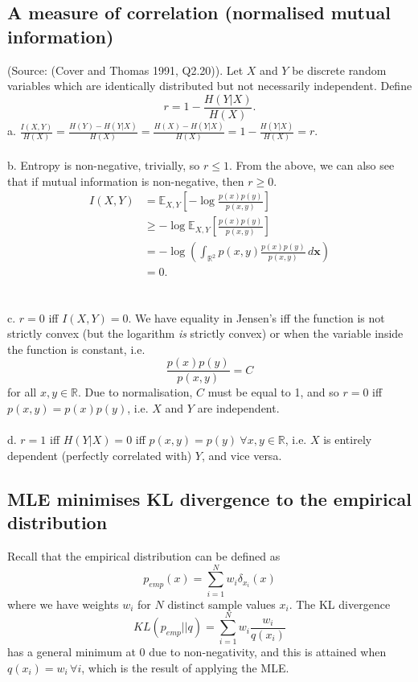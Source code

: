 \documentclass{article}
\begin{document}
\subsection{A measure of correlation (normalised mutual information)}
(Source: (Cover and Thomas 1991, Q2.20)). Let $X$ and $Y$ be discrete random variables which are identically distributed but not necessarily independent. Define
\begin{equation*}
r = 1 - \frac{H(Y|X)}{H(X)}.
\end{equation*}
a. $\frac{I(X,Y)}{H(X)} = \frac{H(Y) - H(Y|X)}{H(X)} = \frac{H(X) - H(Y|X)}{H(X)} = 1 - \frac{H(Y|X)}{H(X)} = r$.\\\\
b. Entropy is non-negative, trivially, so $r \leq 1$. From the above, we can also see that if mutual information is non-negative, then $r \geq 0$.
\begin{align*}
I(X,Y) &= \mathbb{E}_{X,Y}\left[-\log\frac{p(x)p(y)}{p(x,y)}\right]\\
&\geq -\log\mathbb{E}_{X,Y}\left[\frac{p(x)p(y)}{p(x,y)}\right]\tag{Jensen's}\\
&= -\log\left(\int_{\mathbb{R}^2}p(x,y)\frac{p(x)p(y)}{p(x,y)}\,d\mathbf{x}\right)\\
&= 0.\tag*{\qed}
\end{align*}\\\\
c. $r=0$ iff $I(X,Y)=0$. We have equality in Jensen's iff the function is not strictly convex (but the logarithm \textit{is} strictly convex) or when the variable inside the function is constant, i.e.
\begin{equation*}
\frac{p(x)p(y)}{p(x,y)} = C
\end{equation*}
for all $x,y\in\mathbb{R}$. Due to normalisation, $C$ must be equal to 1, and so $r=0$ iff $p(x,y)=p(x)p(y)$, i.e. $X$ and $Y$ are independent.\\\\
d. $r=1$ iff $H(Y|X)=0$ iff $p(x,y)=p(y)\ \forall x,y\in\mathbb{R}$, i.e. $X$ is entirely dependent (perfectly correlated with) $Y$, and vice versa.

\subsection{MLE minimises KL divergence to the empirical distribution}
Recall that the empirical distribution can be defined as
\begin{equation*}
p_{emp}(x) = \sum_{i=1}^N w_i\delta_{x_i}(x)
\end{equation*}
where we have weights $w_i$ for $N$ distinct sample values $x_i$. The KL divergence
\begin{equation*}
KL(p_{emp}||q) = \sum_{i=1}^N w_i \frac{w_i}{q(x_i)}
\end{equation*}
has a general minimum at 0 due to non-negativity, and this is attained when $q(x_i) = w_i \,\forall i$, which is the result of applying the MLE.
\end{document}
